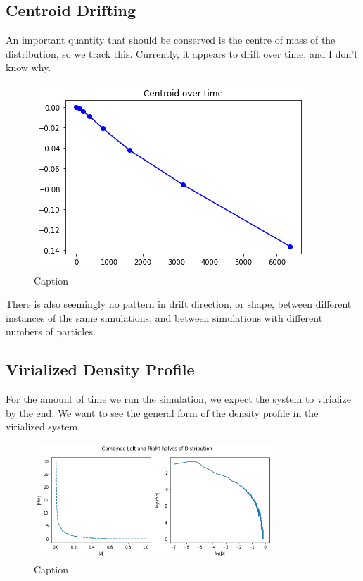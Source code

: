 \documentclass[oneside]{book}
\begin{document}
\subsection{Centroid Drifting}
An important quantity that should be conserved is the centre of mass of the distribution, so we track this. {\color{red}Currently, it appears to drift over time, and I don't know why}.
\begin{figure}[h]
    \centering
    \includegraphics[scale = 0.75]{Images/Centroid.png}
    \caption{Caption}
    \label{Centroid Drift}
\end{figure}
There is also seemingly no pattern in drift direction, or shape, between different instances of the same simulations, and between simulations with different numbers of particles.

\subsection{Virialized Density Profile}
For the amount of time we run the simulation, we expect the system to virialize by the end. We want to see the general form of the density profile in the virialized system.
\begin{figure}[h]
    \centering
    \includegraphics[width = 0.8\textwidth]{Images/DensityProfile.png}
    \caption{Caption}
    \label{Density Profile}
\end{figure}
\end{document}
